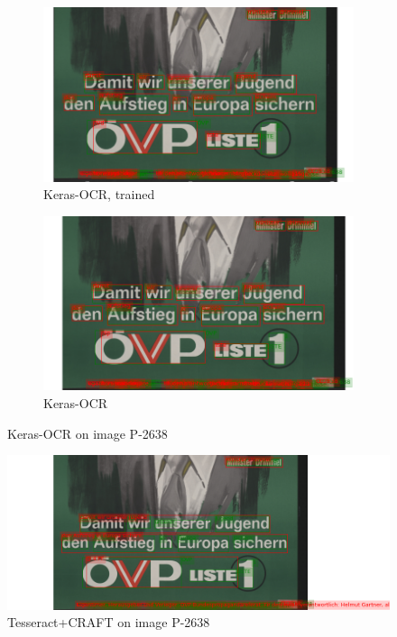 \begin{figure}[hbtp!]
    \begin{subfigure}{\textwidth}
        \centering
        \includegraphics[scale=0.36]{obrazky/plakaty/result_kerasOCRtrained_vienna1_split-90.png}
        \caption{Keras-OCR, trained}
        \label{Im1:ex:kertr}
    \end{subfigure}

    \begin{subfigure}{\textwidth}
        \centering
        \includegraphics[scale=0.36]{obrazky/plakaty/result_kerasOCR_vienna1_nosplit_nocorrection-90.png}
        \caption{Keras-OCR}
        \label{Im1:ex:ker}
    \end{subfigure}
    
    \caption{Keras-OCR  on image P-2638}
    \label{Im1:ex:Keras}
\end{figure}


\begin{figure}[hbtp!]
    \centering
    \includegraphics[scale=0.36]{obrazky/plakaty/result_carfttesseract_vienna1_split_special_snesitive-91.png}
    \caption{Tesseract+CRAFT  on image P-2638}
    \label{Im1:ex:craft}
\end{figure}


